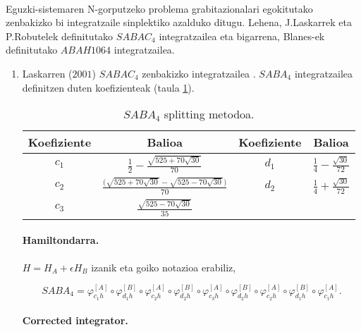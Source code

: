 \paragraph*{}Eguzki-sistemaren N-gorputzeko problema grabitazionalari egokitutako zenbakizko bi integratzaile sinplektiko azalduko ditugu. Lehena, J.Laskarrek eta P.Robutelek \cite{Laskar2001} definitutako \emph{$SABAC_4$} integratzailea eta bigarrena, Blanes-ek \cite{Blanes2013} \cite{Farres2013} definitutako \emph{$ABAH1064$} integratzailea. 

\begin{enumerate}
\item Laskarren ($2001$) $SABAC_4$ zenbakizko integratzailea \cite{Laskar2001}.
$SABA_4$ integratzailea definitzen duten koefizienteak (taula \ref{tab:32}).
 
\begin{table}
\caption[$SABA_4$ splitting metodoa.] 
{\small{$SABA_4$ splitting metodoa.}}
\label{tab:32}       %
\begin{tabular}{ c c | c c} 
 \hline
 Koefiziente         &  Balioa  & Koefiziente         &  Balioa  \\
 \hline
 $c_1$ & $\frac{1}{2}-\frac{\sqrt{525+70\sqrt{30}}}{70}$ 
       & $d_1$ & $\frac{1}{4}-\frac{\sqrt{30}}{72}$\\
 $c_2$ & $\frac{\big( \sqrt{525+70 \sqrt{30}}-\sqrt{525-70 \sqrt{30}} \big)}{70}$ 
       & $d_2$ & $\frac{1}{4}+\frac{\sqrt{30}}{72}$\\
 $c_3$ & $\frac{\sqrt{525-70\sqrt{30}}}{35}$ & & \\
  \hline
 \end{tabular}
\end{table}


\paragraph*{Hamiltondarra.} $H=H_A+\epsilon H_B$ izanik eta goiko notazioa erabiliz,

\begin{equation*}
SABA_4=\varphi^{[A]}_{c_1 h} \circ \varphi^{[B]}_{d_1 h} \circ \varphi^{[A]}_{c_2 h} \circ \varphi^{[B]}_{d_2 h}
         \circ  \varphi^{[A]}_{c_3 h}   \circ
          \varphi^{[B]}_{d_2 h} \circ \varphi^{[A]}_{c_2 h} \circ   \varphi^{[B]}_{d_1 h}\circ  \varphi^{[A]}_{c_1 h}.
\end{equation*}


\paragraph*{Corrected integrator.}


\end{enumerate}
